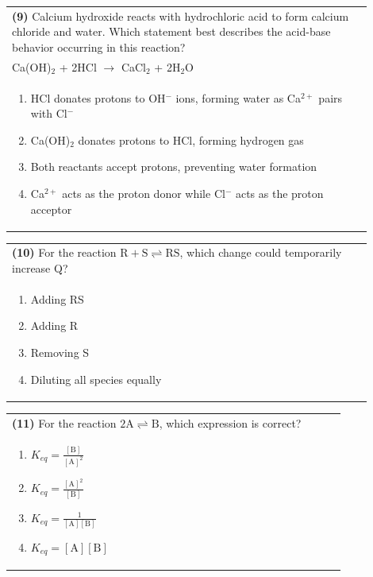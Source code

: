 \documentclass{article}
\begin{document}
\noindent\begin{tabular}{|p{0.9\linewidth}|}
\hline
\textbf{(9)} Calcium hydroxide reacts with hydrochloric acid to form calcium chloride and water. Which statement best describes the acid-base behavior occurring in this reaction?\\[0.2cm]
Ca(OH)$_2$ + 2HCl $\rightarrow$ CaCl$_2$ + 2H$_2$O\\[0.2cm]
\begin{minipage}[t]{0.85\linewidth}
\begin{enumerate}[label=\alph*.]
\item HCl donates protons to OH$^-$ ions, forming water as Ca$^{2+}$ pairs with Cl$^-$
\item Ca(OH)$_2$ donates protons to HCl, forming hydrogen gas
\item Both reactants accept protons, preventing water formation
\item Ca$^{2+}$ acts as the proton donor while Cl$^-$ acts as the proton acceptor
\end{enumerate}
\end{minipage}\\[0.2cm]
\hline
\end{tabular}

\noindent\begin{tabular}{|p{0.9\linewidth}|}
\hline
\textbf{(10)} For the reaction $\text{R} + \text{S} \rightleftharpoons \text{RS}$, which change could temporarily increase Q?\\[0.2cm]
\begin{minipage}[t]{0.85\linewidth}
\begin{enumerate}[label=\alph*.]
\item Adding RS
\item Adding R
\item Removing S
\item Diluting all species equally
\end{enumerate}
\end{minipage}\\[0.2cm]
\hline
\end{tabular}

\noindent\begin{tabular}{|p{0.9\linewidth}|}
\hline
\textbf{(11)} For the reaction $2\text{A} \rightleftharpoons \text{B}$, which expression is correct?\\[0.2cm]
\begin{minipage}[t]{0.85\linewidth}
\begin{enumerate}[label=\alph*.]
\item $K_{eq}=\frac{[\text{B}]}{[\text{A}]^2}$
\item $K_{eq}=\frac{[\text{A}]^2}{[\text{B}]}$
\item $K_{eq}=\frac{1}{[\text{A}][\text{B}]}$
\item $K_{eq}=[\text{A}][\text{B}]$
\end{enumerate}
\end{minipage}\\[0.2cm]
\hline
\end{tabular}
\end{document}
